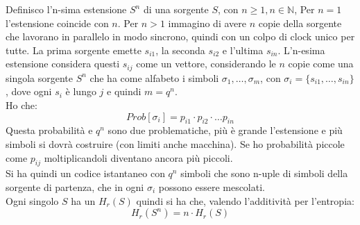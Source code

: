 \documentclass[a4paper,12pt, oneside]{book}
\begin{document}
\begin{definizione}
  Definisco l'n-sima estensione $S^n$ di una sorgente $S$, con $n\geq 1, n\in
  \mathbb{N}$, Per $n=1$ l'estensione coincide con $n$. Per $n>1$ immagino di
  avere $n$ copie della sorgente che lavorano in parallelo in modo sincrono,
  quindi con un colpo di clock unico per tutte. La prima sorgente emette
  $s_{i1}$, la seconda $s_{i2}$ e l'ultima $s_{in}$. L'n-esima estensione
  considera questi $s_{ij}$ come un vettore, considerando le $n$ copie come una
  singola sorgente $S^n$ che ha come alfabeto i simboli $\sigma_1,
  \ldots,\sigma_m$, con $\sigma_i=\{s_{i1},\ldots, s_{in}\}$, dove ogni $s_i$ è
  lungo $j$ e quindi $m=q^n$. \\
  Ho che:
  \[Prob[\sigma_i]=p_{i1}\cdot p_{i2}\cdot \ldots p_{in}\]
  Questa probabilità e $q^n$ sono due problematiche, più è grande l'estensione e
  più simboli si dovrà costruire (con limiti anche macchina). Se ho probabilità
  piccole come $p_{ij}$ moltiplicandoli diventano ancora più piccoli.\\
  Si ha quindi un codice istantaneo con $q^n$ simboli che sono n-uple di simboli
  della sorgente di partenza, che in ogni $\sigma_i$ possono essere
  mescolati. \\
  Ogni singolo $S$ ha un $H_r(S)$ quindi si ha che, valendo l'additività per
  l'entropia: 
  \[H_r(S^n)=n\cdot H_r(S)\]
  
\end{definizione}
\end{document}
